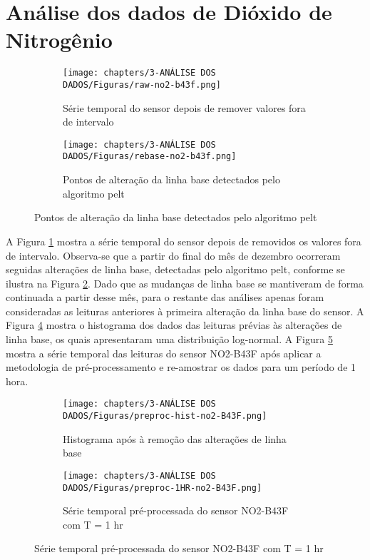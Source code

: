 \section{Análise dos dados de Dióxido de Nitrogênio}

\begin{figure}[h]
    \centering
    \caption{Série temporal do sensor NO2-B43F}
    \begin{subfigure}{0.495\textwidth}
        \texttt{[image: chapters/3-ANÁLISE DOS DADOS/Figuras/raw-no2-b43f.png]}
        \caption{Série temporal do sensor depois de remover valores fora de intervalo}
        \label{fig:data-no2-raw}
    \end{subfigure}
    \hfill
    \begin{subfigure}{0.495\textwidth}
        \texttt{[image: chapters/3-ANÁLISE DOS DADOS/Figuras/rebase-no2-b43f.png]}
        \caption{Pontos de alteração da linha base detectados pelo algoritmo \acrshort{pelt}}
        \label{fig:data-rebase-no2}
    \end{subfigure}
    \hfill
    \label{fig:data-no2-raw-and-pelt}
\end{figure}

A Figura \ref{fig:data-no2-raw} mostra a série temporal do sensor depois de removidos os valores fora de intervalo. Observa-se que a partir do final do mês de dezembro ocorreram seguidas alterações de linha base, detectadas pelo algoritmo \acrshort{pelt}, conforme se ilustra na Figura \ref{fig:data-rebase-no2}. Dado que as mudanças de linha base se mantiveram de forma continuada a partir desse mês, para o restante das análises apenas foram consideradas as leituras anteriores à primeira alteração da linha base do sensor. A Figura \ref{fig:data-no2-preproc-hist} mostra o histograma dos dados das leituras prévias às alterações de linha base, os quais apresentaram uma distribuição log-normal. A Figura \ref{fig:data-co-preproc-1HR} mostra a série temporal das leituras do sensor NO2-B43F após aplicar a metodologia de pré-processamento e re-amostrar os dados para um período de 1 hora.

\begin{figure}[h]
    \centering
    \caption{Histograma das leituras do sensor NO2-B43F}
    \begin{subfigure}{0.4\textwidth}
        \texttt{[image: chapters/3-ANÁLISE DOS DADOS/Figuras/preproc-hist-no2-B43F.png]}
        \caption{Histograma após à remoção das alterações de linha base}
        \label{fig:data-no2-preproc-hist}
    \end{subfigure}
    \hfill
    \begin{subfigure}{0.4\textwidth}
        \texttt{[image: chapters/3-ANÁLISE DOS DADOS/Figuras/preproc-1HR-no2-B43F.png]}
        \caption{Série temporal pré-processada do sensor NO2-B43F com T = 1 hr}
        \label{fig:data-co-preproc-1HR}
    \end{subfigure}
    \label{fig:data-no2-preproc}
\end{figure}

